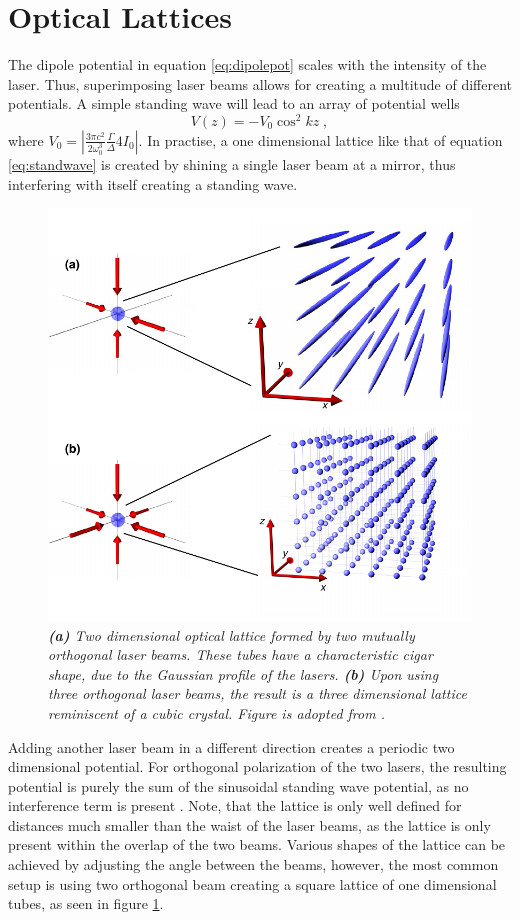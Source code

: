 \section{Optical Lattices}

The dipole potential in equation \ref{eq:dipolepot} scales with the intensity of the laser. Thus, superimposing laser beams allows for creating a multitude of different potentials. A simple standing wave will lead to an array of potential wells
\begin{equation}
	V(z) = - V_0 \cos^2{k z } \; ,
	\label{eq:standwave}
\end{equation}
 where $V_0 = | \frac{3 \pi c^2}{2 \omega_{0}^3} \frac{\Gamma}{\Delta} 4 I_0 |$. In practise, a one dimensional lattice like that of equation \ref{eq:standwave} is created by shining a single laser beam at a mirror, thus interfering with itself creating a standing wave.
\begin{figure}[!h]
	\centering
	\includegraphics[width=0.8\columnwidth]{Figures/OpticalLattice.pdf} 
	\caption{\textit{\textbf{(a)} Two dimensional optical lattice formed by two mutually orthogonal laser beams. These tubes have a characteristic cigar shape, due to the Gaussian profile of the lasers. \textbf{(b)} Upon using three orthogonal laser beams, the result is a three dimensional lattice reminiscent of a cubic crystal. Figure is adopted from \cite{WideraThesis}.}}
	\label{fig:OpticalLattice} 
\end{figure}
Adding another laser beam in a different direction creates a periodic two dimensional potential. For orthogonal polarization of the two lasers, the resulting potential is purely the sum of the sinusoidal standing wave potential, as no interference term is present \cite{lewenstein}. Note, that the lattice is only well defined for distances much smaller than the waist of the laser beams, as the lattice is only present within the overlap of the two beams. Various shapes of the lattice can be achieved by adjusting the angle between the beams, however, the most common setup is using two orthogonal beam creating a square lattice of one dimensional tubes, as seen in figure \ref{fig:OpticalLattice}.

